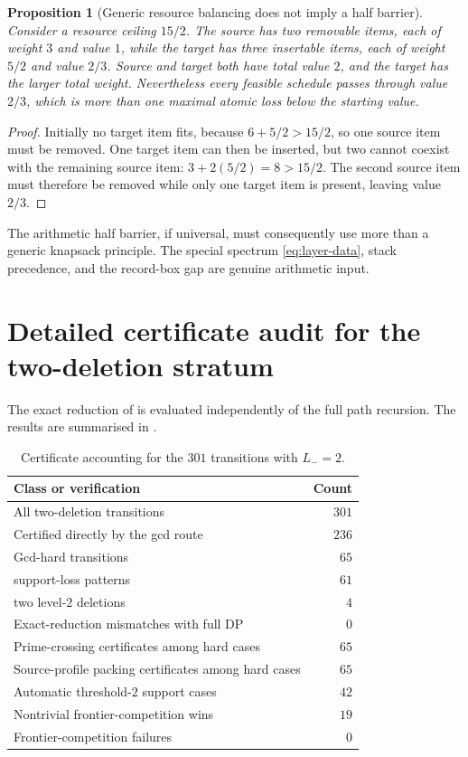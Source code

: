 \documentclass[11pt]{article}
\numberwithin{equation}{section}
\theoremstyle{blueplain}
\newtheorem{proposition}[theorem]{Proposition}
\theoremstyle{bluedef}
\begin{document}
\begin{proposition}[Generic resource balancing does not imply a half barrier]
\label{prop:generic-scheduling-counterexample}
Consider a resource ceiling $15/2$.  The source has two removable items, each of weight $3$ and value $1$, while the target has three insertable items, each of weight $5/2$ and value $2/3$.  Source and target both have total value $2$, and the target has the larger total weight.  Nevertheless every feasible schedule passes through value $2/3$, which is more than one maximal atomic loss below the starting value.
\end{proposition}

\begin{proof}
Initially no target item fits, because $6+5/2>15/2$, so one source item must be removed.  One target item can then be inserted, but two cannot coexist with the remaining source item: $3+2(5/2)=8>15/2$.  The second source item must therefore be removed while only one target item is present, leaving value $2/3$.
\end{proof}

The arithmetic half barrier, if universal, must consequently use more than a generic knapsack principle.  The special spectrum \eqref{eq:layer-data}, stack precedence, and the record-box gap are genuine arithmetic input.

\section{Detailed certificate audit for the two-deletion stratum}
\label{app:l2-certificate-audit}

The exact reduction of  is evaluated independently of the full path recursion.  The results are summarised in .

\begin{table}[t]
\centering
\caption{Certificate accounting for the $301$ transitions with $L_-=2$.}
\label{tab:l2-certificates}
\begin{tabularx}{0.92\textwidth}{@{}Xr@{}}
\toprule
Class or verification & Count\\
\midrule
All two-deletion transitions & $301$\\
Certified directly by the gcd route & $236$\\
Gcd-hard transitions & $65$\\
\quad support-loss patterns & $61$\\
\quad two level-$2$ deletions & $4$\\
Exact-reduction mismatches with full DP & $0$\\
Prime-crossing certificates among hard cases & $65$\\
Source-profile packing certificates among hard cases & $65$\\
Automatic threshold-$2$ support cases & $42$\\
Nontrivial frontier-competition wins & $19$\\
Frontier-competition failures & $0$\\
\bottomrule
\end{tabularx}
\end{table}
\end{document}
